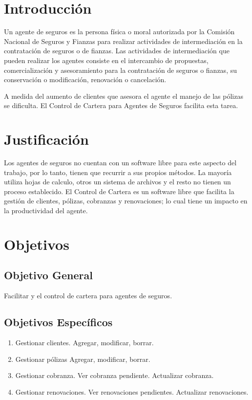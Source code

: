 \setcounter{page}{1}

\section*{Introducción}%
Un agente de seguros es la persona física o moral autorizada por la Comisión Nacional de Seguros y Fianzas para realizar actividades de intermediación en la contratación de seguros o de fianzas. Las actividades de intermediación que pueden realizar los agentes consiste en el intercambio de propuestas, comercialización y asesoramiento para la contratación de seguros o fianzas, su conservación o modificación, renovación o cancelación. \cite{www:reg-agentes}

A medida del aumento de clientes que asesora el agente el manejo de las pólizas se dificulta.
El Control de Cartera para Agentes de Seguros facilita esta tarea.

\section*{Justificación}

Los agentes de seguros no cuentan con un software libre para este aspecto del trabajo, por lo tanto, tienen que recurrir a sus propios métodos. La mayoría utiliza hojas de calculo, otros un sistema de archivos y el resto no tienen 
un proceso establecido.
El Control de Cartera es un software libre que facilita la gestión de clientes, pólizas, cobranzas y renovaciones; lo cual tiene un impacto en la productividad del agente.

\section*{Objetivos}

\subsection*{Objetivo General}
Facilitar y el control de cartera para agentes de seguros.

\subsection*{Objetivos Específicos}
\begin{enumerate}
  \item Gestionar clientes.
  \subitem Agregar, modificar, borrar.
  \item Gestionar pólizas
    \subitem Agregar, modificar, borrar.
  \item Gestionar cobranza.
  \subitem Ver cobranza pendiente.
  \subitem Actualizar cobranza.
  \item Gestionar renovaciones.
  \subitem Ver renovaciones pendientes.
  \subitem Actualizar renovaciones.
\end{enumerate}

